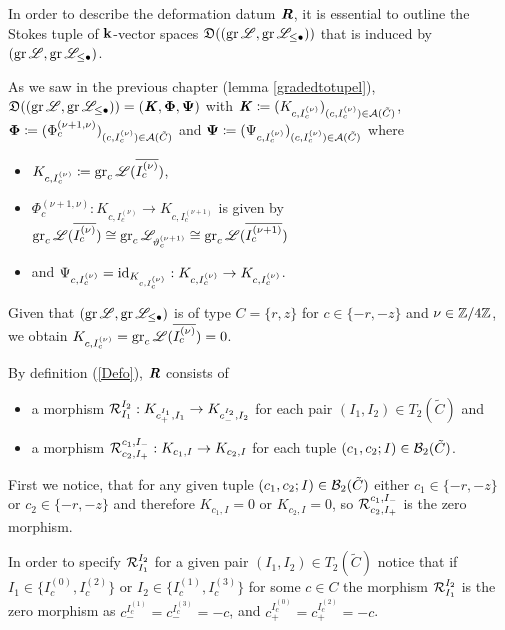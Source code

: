 In order to describe the deformation datum $\bm{\mathit{R}}$, it is essential to outline the Stokes tuple of $\mathbf{k}$-vector spaces $\mathfrak{D}((\operatorname{gr}\mathscr{L}, \operatorname{gr}\mathscr{L}_{\leq \bullet}))$ that is induced by $(\operatorname{gr}\mathscr{L},\operatorname{gr}\mathscr{L}_{\leq \bullet})$. 

As we saw in the previous chapter (lemma \ref{gradedtotupel}), $\mathfrak{D}((\operatorname{gr}\mathscr{L}, \operatorname{gr}\mathscr{L}_{\leq \bullet}))=(\bm{\mathit{K}}, \bm{\Phi},\bm{\Psi})$ with $\bm{\mathit{K}} \coloneqq (K_{c,I_c^{(\nu)}})_{(c,I_c^{(\nu)}) \in \mathcal{A}(\tilde{C})}$, $\bm\Phi \coloneqq (\Phi_c^{(\nu+1,\nu)})_{(c,I_c^{(\nu)}) \in \mathcal{A}(\tilde{C})}$ and $\bm\Psi \coloneqq (\Psi_{c,I_c^{(\nu)}})_{(c,I_c^{(\nu)}) \in \mathcal{A}(\tilde{C})}$ where 
\begin{itemize}
    \item $K_{c,I_c^{(\nu)}} \coloneqq \operatorname{gr}_c\mathscr{L}(\overline{I_c^{(\nu)}})$,
    \item $\Phi_c^{(\nu+1,\nu)}:K_{c, I^{(\nu)}_c} \to K_{c,I^{(\nu+1)}_c}$ is given by $\operatorname{gr}_c\mathscr{L}(\overline{I^{(\nu)}_c}) \cong \operatorname{gr}_c\mathscr{L}_{\vartheta_c^{(\nu+1)}} \cong \operatorname{gr}_c\mathscr{L}(\overline{I_c^{(\nu+1)}})$
    \item and $\Psi_{c,I^{(\nu)}_c} = \operatorname{id}_{K_{c,I_c^{(\nu)}}}:K_{c,I_c^{(\nu)}} \to K_{c,I_c^{(\nu)}}$.
\end{itemize}

Given that $(\operatorname{gr}\mathscr{L}, \operatorname{gr}\mathscr{L}_{\leq \bullet})$ is of type $C=\{r,z\}$ for $c \in \{-r,-z\}$ and $\nu \in \mathbb{Z}/4\mathbb{Z}$, we obtain $K_{c,I_c^{(\nu)}}= \operatorname{gr}_c\mathscr{L}(\overline{I^{(\nu)}_c}) =0$.



By definition (\ref{Defo}), $\bm{\mathit{R}}$ consists of 
\begin{itemize}
    \item a morphism $\mathcal{R}_{I_1}^{I_2}:K_{c_+^{I_1},I_1} \to K_{c_-^{I_2},I_2}$ for each pair $(I_1, I_2) \in T_2(\tilde{C})$ and
    \item a morphism $\mathcal{R}_{c_2, I_+}^{c_1, I_-}: K_{c_1, I} \to K_{c_2, I}$ for each tuple $(c_1,c_2;I) \in \mathcal{B}_2(\tilde{C})$.
\end{itemize}

First we notice, that for any given tuple $(c_1,c_2;I) \in \mathcal{B}_2(\tilde{C})$ either $c_1 \in \{-r,-z\}$ or $c_2 \in \{-r,-z\}$ and therefore $K_{c_1,I}=0$ or $K_{c_2,I}=0$, so $\mathcal{R}_{c_2, I_+}^{c_1, I_-}$ is the zero morphism.

In order to specify $\mathcal{R}_{I_1}^{I_2}$ for a given pair $(I_1,I_2) \in T_2(\tilde{C})$ notice that if $I_1 \in \{I_c^{(0)}, I_c^{(2)}\}$ or $I_2 \in \{I_c^{(1)}, I_c^{(3)}\}$ for some $c \in C$ the morphism $\mathcal{R}_{I_1}^{I_2}$ is the zero morphism as $c_{-}^{I_c^{(1)}} = c_-^{I_c^{(3)}}=-c$, and $c_+^{I_c^{(0)}}=c_+^{I_c^{(2)}}=-c$. 

